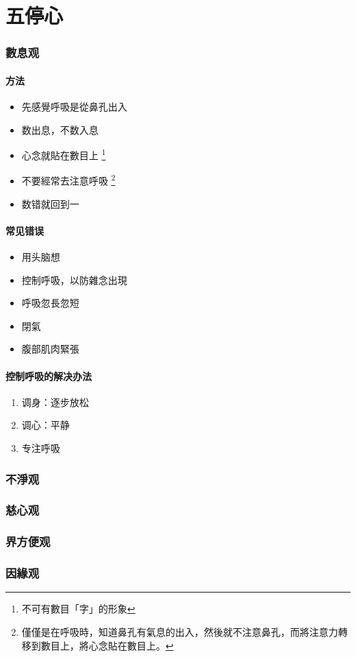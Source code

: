 \section{五停心}

\subsubsection{數息观}
\paragraph{方法}
\begin{itemize}
  \item 先感覺呼吸是從鼻孔出入
  \item 数出息，不数入息
  \item 心念就貼在數目上
    \footnote{不可有數目「字」的形象}
  \item 不要經常去注意呼吸
    \footnote{僅僅是在呼吸時，知道鼻孔有氣息的出入，然後就不注意鼻孔，而將注意力轉移到數目上，將心念貼在數目上。}
  \item 数错就回到一
\end{itemize}
\paragraph{常见错误}
\begin{itemize}
  \item 用头脑想
  \item 控制呼吸，以防雜念出現
  \item 呼吸忽長忽短
  \item 閉氣
  \item 腹部肌肉緊張
\end{itemize}
\paragraph{控制呼吸的解决办法}
\begin{enumerate}
  \item 调身：逐步放松
  \item 调心：平静
  \item 专注呼吸
\end{enumerate}


\subsubsection{不淨观}

\subsubsection{慈心观}

\subsubsection{界方便观}

\subsubsection{因緣观}
